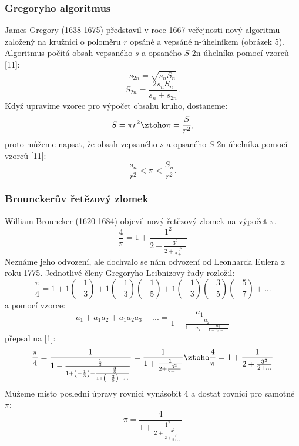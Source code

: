 \documentclass[rocnikovka]{gzwroc} %
\begin{document}
\subsubsection{Gregoryho algoritmus}
James Gregory (1638-1675) představil v roce 1667 veřejnosti nový algoritmu založený na kružnici o poloměru $r$ opsáné a vepsáné n-úhelníkem (obrázek 5). Algoritmus počítá obsah vepsaného $s$ a opsaného $S$ 2n-úhelníka pomocí vzorců [11]:
\begin{equation}
s_{2n}=\sqrt{s_nS_n}
\end{equation}
\begin{equation}
S_{2n}=\frac{2s_nS_n}{s_n+s_{2n}}.
\end{equation}
Když upravíme vzorec pro výpočet obsahu kruho, dostaneme:
$$
S=\pi r^2 \ztoho \pi=\frac{S}{r^2},
$$
proto můžeme napsat, že
obsah vepsaného $s$ a opsaného $S$ 2n-úhelníka pomocí vzorců [11]:
\begin{equation}
\frac{s_n}{r^2}<\pi<\frac{S_n}{r^2}. 
\end{equation}
\subsubsection{Brounckerův řetězový zlomek}
William Brouncker (1620-1684) objevil nový řetězový zlomek na výpočet $\pi$.
\begin{equation}
\frac{4}{\pi}=1+\frac{1^2}{2+\frac{3^2}{2+\frac{5^2}{2+...}}}
\end{equation}
Neznáme jeho odvození, ale dochvalo se nám odvození od Leonharda Eulera z roku 1775. Jednotlivé členy Gregoryho-Leibnizovy řady rozložil:
$$
\frac{\pi}{4}=1+1\left(-\frac{1}{3}\right)+1\left(-\frac{1}{3}\right)\left(-\frac{1}{5}\right)+1\left(-\frac{1}{3}\right)\left(-\frac{3}{5}\right)\left(-\frac{5}{7}\right)+...
$$
a pomocí vzorce:
$$
a_1+a_1a_2+a_1a_2a_3+...=\frac{a_1}{1-\frac{a_2}{1+a_2-\frac{a_3}{1+a_3-...}}}
$$
přepsal na [1]:
$$
\frac{\pi}{4}=\frac{1}{1-\frac{-\frac{1}{3}}{1+\left(-\frac{1}{3}\right)-\frac{-\frac{3}{5}}{1+\left(-\frac{3}{5}\right)-...}}}=\frac{1}{1+\frac{1}{2+\frac{3^2}{2+...}}} \ztoho \frac{4}{\pi}=1+\frac{1}{2+\frac{3^2}{2+...}}
$$
Můžeme místo poslední úpravy rovnici vynásobit 4 a dostat rovnici pro samotné $\pi$:
\begin{equation}
\pi=\frac{4}{1+\frac{1^2}{2+\frac{3^2}{2+\frac{5^2}{2+...}}}}
\end{equation}
\end{document}
